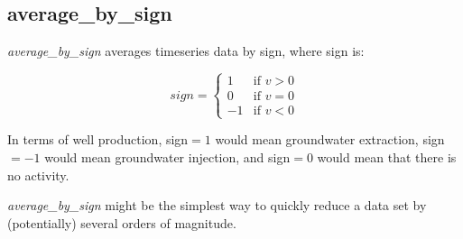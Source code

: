 \documentclass[10pt,twoside,openright]{memoir}
\begin{document}
\subsection{average\_by\_sign}
\emph{average\_by\_sign} averages timeseries data by sign, where sign is:

\begin{equation}
  sign = 
    \begin{cases}
      1 & \text{if $v > 0 $} \\
      0 & \text{if $v = 0 $} \\
     -1 & \text{if $v < 0 $} 
    \end{cases}
\end{equation}

In terms of well production, sign$=1$ would mean groundwater extraction, 
sign$=-1$ would mean groundwater injection, and sign$=0$ would mean that
there is no activity.

 \emph{average\_by\_sign} might be the simplest way to quickly reduce a 
 data set by (potentially) several orders of magnitude.
\end{document}
